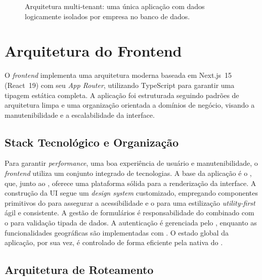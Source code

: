 \begin{figure}[H]
  \caption{Arquitetura multi-tenant: uma única aplicação com dados logicamente isolados por empresa no banco de dados.}
  \label{fig:multi-tenant-melhorada}
\end{figure}

\section{Arquitetura do Frontend}

O \textit{frontend} implementa uma arquitetura moderna baseada em Next.js~15 (React~19) com seu \textit{App Router}, utilizando TypeScript para garantir uma tipagem estática completa. A aplicação foi estruturada seguindo padrões de arquitetura limpa e uma organização orientada a domínios de negócio, visando a manutenibilidade e a escalabilidade da interface.

\subsection{Stack Tecnológico e Organização}

Para garantir \textit{performance}, uma boa experiência de usuário e manutenibilidade, o \textit{frontend} utiliza um conjunto integrado de tecnologias. A base da aplicação é o , que, junto ao , oferece uma plataforma sólida para a renderização da interface. A construção da UI segue um \textit{design system} customizado, empregando componentes primitivos do  para assegurar a acessibilidade e o  para uma estilização \textit{utility-first} ágil e consistente. A gestão de formulários é responsabilidade do  combinado com o  para validação tipada de dados. A autenticação é gerenciada pelo , enquanto as funcionalidades geográficas são implementadas com . O estado global da aplicação, por sua vez, é controlado de forma eficiente pela  nativa do .

\subsection{Arquitetura de Roteamento}

